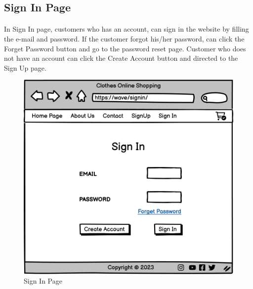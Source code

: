 \subsection{Sign In Page}
\bigskip
\paragraph{}
In Sign In page, customers who has an account, can sign in the website by filling the e-mail and password. If the customer forgot his/her password, can click the Forget Password button and go to the password reset page. Customer who does not have an account can click the Create Account button and directed to the Sign Up page. 

\bigskip
\bigskip
\bigskip
\begin{figure}[h]
\centerline{\includegraphics[scale=1.]{images/Sign In.png}}
\caption{Sign In Page}
\label{fig}
\end{figure}